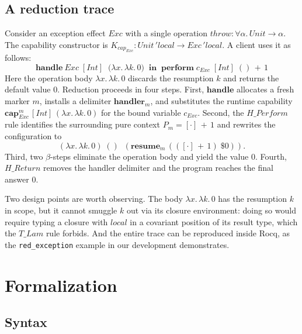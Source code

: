 \documentclass[12pt,a4paper]{article}
\newcommand{\keyword}[1]{\mathbf{#1}}
\begin{document}
    \subsection{A reduction trace}\label{subsec:running-example}

    Consider an exception effect $\mathit{Exc}$ with a single operation
    $\mathit{throw} : \forall \alpha.\,Unit \to \alpha$.
    The capability constructor is $K_{cap_{\mathit{Exc}}} : Unit\,'\!local \to
    \mathit{Exc}\,'\!local$.
    A client uses it as follows:
    \[
        \keyword{handle}~\mathit{Exc}\;[Int]\;\;\big(\lambda x.\,\lambda k.\,0\big)\;\;\keyword{in}\;\;
        \keyword{perform}\;c_{\mathit{Exc}}\;[Int]\;()\,+\,1
    \]
    Here the operation body $\lambda x.\,\lambda k.\,0$ discards the resumption $k$
    and returns the default value $0$.
    Reduction proceeds in four steps.
    First, $\keyword{handle}$ allocates a fresh marker $m$, installs a delimiter
    $\keyword{handler}_m$, and substitutes the runtime capability
    $\keyword{cap}_{\mathit{Exc}}^m\,[Int]\,(\lambda x.\,\lambda k.\,0)$ for the bound
    variable $c_{\mathit{Exc}}$.
    Second, the $H\!\_Perform$ rule identifies the surrounding pure context
    $P_m = [\cdot]\,+\,1$ and rewrites the configuration to
    \[
        (\lambda x.\,\lambda k.\,0)\;()\;\;(\keyword{resume}_m\,(([\cdot]\,+\,1)\;\$0)).
    \]
    Third, two $\beta$-steps eliminate the operation body and yield the value $0$.
    Fourth, $H\!\_Return$ removes the handler delimiter and the program reaches the
    final answer $0$.

    Two design points are worth observing.
    The body $\lambda x.\,\lambda k.\,0$ has the resumption $k$ in scope, but it
    cannot smuggle $k$ out via its closure environment: doing so would require
    typing a closure with $local$ in a covariant position of its result type, which
    the $T\!\_Lam$ rule forbids.
    And the entire trace can be reproduced inside Rocq, as the
    \texttt{red\_exception} example in our development demonstrates.


    \section{Formalization} \label{sec:formalization}

    \subsection{Syntax}
\end{document}
